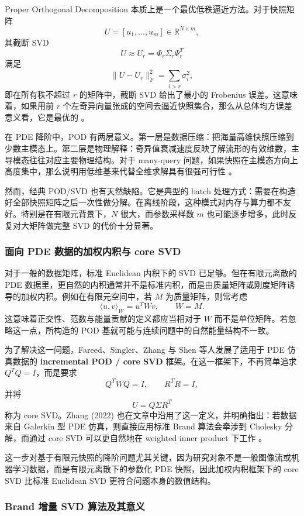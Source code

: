 Proper Orthogonal Decomposition 本质上是一个最优低秩逼近方法。对于快照矩阵
\[
U=[u_1,\dots,u_m]\in\mathbb R^{N\times m},
\]
其截断 SVD
\[
U\approx U_r=\Phi_r\Sigma_r\Psi_r^T
\]
满足
\[
\|U-U_r\|_F^2=\sum_{i>r}\sigma_i^2,
\]
即在所有秩不超过 $r$ 的矩阵中，截断 SVD 给出了最小的 Frobenius 误差。这意味着，如果用前 $r$ 个左奇异向量张成的空间去逼近快照集合，那么从总体均方误差意义看，它是最优的 \cite{golub2013matrix}。

在 PDE 降阶中，POD 有两层意义。第一层是数据压缩：把海量高维快照压缩到少数主模态上。第二层是物理解释：奇异值衰减速度反映了解流形的有效维数，主导模态往往对应主要物理结构。对于 many-query 问题，如果快照在主模态方向上高度集中，那么说明用低维基来代替全维求解具有很强可行性 \cite{hesthaven2015,golub2013matrix}。

然而，经典 POD/SVD 也有天然缺陷。它是典型的 batch 处理方式：需要在构造好全部快照矩阵之后一次性做分解。在离线阶段，这种模式对内存与算力都不友好。特别是在有限元背景下，$N$ 很大，而参数采样数 $m$ 也可能逐步增多，此时反复对大矩阵做完整 SVD 的代价十分显著。

\subsubsection{面向 PDE 数据的加权内积与 core SVD}

对于一般的数据矩阵，标准 Euclidean 内积下的 SVD 已足够。但在有限元离散的 PDE 数据里，更自然的内积通常并不是标准内积，而是由质量矩阵或刚度矩阵诱导的加权内积。例如在有限元空间中，若 $M$ 为质量矩阵，则常考虑
\[
\langle u,v\rangle_W=u^T W v,\qquad W=M.
\]
这意味着正交性、范数与能量贡献的定义都应当相对于 $W$ 而不是单位矩阵。若忽略这一点，所构造的 POD 基就可能与连续问题中的自然能量结构不一致。

为了解决这一问题，Fareed、Singler、Zhang 与 Shen 等人发展了适用于 PDE 仿真数据的 \textbf{incremental POD / core SVD} 框架。在这一框架下，不再简单追求 $Q^TQ=I$，而是要求
\[
Q^T W Q=I,\qquad R^T R=I,
\]
并将
\[
U=Q\Sigma R^T
\]
称为 core SVD。Zhang (2022) 也在文章中沿用了这一定义，并明确指出：若数据来自 Galerkin 型 PDE 仿真，则直接应用标准 Brand 算法会牵涉到 Cholesky 分解，而通过 core SVD 可以更自然地在 weighted inner product 下工作 \cite{fareed2018,zhang2022}。

这一步对基于有限元快照的降阶问题尤其关键，因为研究对象不是一般图像流或机器学习数据，而是有限元离散下的参数化 PDE 快照，因此加权内积框架下的 core SVD 比标准 Euclidean SVD 更符合问题本身的数值结构。

\subsubsection{Brand 增量 SVD 算法及其意义}

